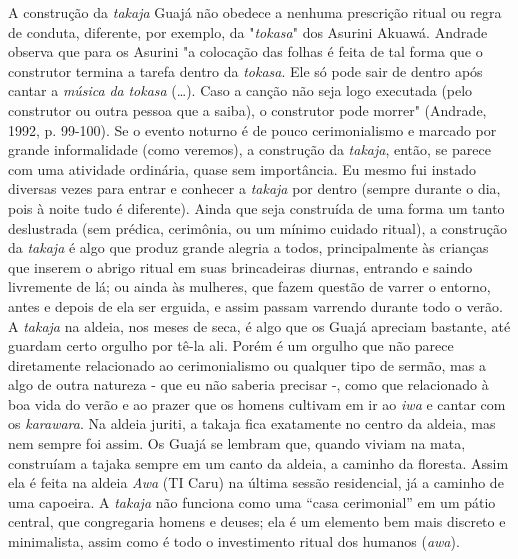 A construção da \emph{takaja} Guajá não obedece a nenhuma prescrição
ritual ou regra de conduta, diferente, por exemplo, da "\emph{tokasa}"
dos Asurini Akuawá. Andrade observa que para os Asurini "a colocação das
folhas é feita de tal forma que o construtor termina a tarefa dentro da
\emph{tokasa}. Ele só pode sair de dentro após cantar a \emph{música}
\emph{da} \emph{tokasa} (\ldots{}). Caso a canção não seja logo executada
(pelo construtor ou outra pessoa que a saiba), o construtor pode morrer"
(Andrade, 1992, p. 99-100). Se o evento noturno é de pouco
cerimonialismo e marcado por grande informalidade (como veremos), a
construção da \emph{takaja}, então, se parece com uma atividade
ordinária, quase sem importância. Eu mesmo fui instado diversas vezes
para entrar e conhecer a \emph{takaja} por dentro (sempre durante o dia,
pois à noite tudo é diferente). Ainda que seja construída de uma forma
um tanto deslustrada (sem prédica, cerimônia, ou um mínimo cuidado
ritual), a construção da \emph{takaja} é algo que produz grande alegria
a todos, principalmente às crianças que inserem o abrigo ritual em suas
brincadeiras diurnas, entrando e saindo livremente de lá; ou ainda às
mulheres, que fazem questão de varrer o entorno, antes e depois de ela
ser erguida, e assim passam varrendo durante todo o verão. A
\emph{takaja} na aldeia, nos meses de seca, é algo que os Guajá apreciam
bastante, até guardam certo orgulho por tê-la ali. Porém é um orgulho
que não parece diretamente relacionado ao cerimonialismo ou qualquer
tipo de sermão, mas a algo de outra natureza - que eu não saberia
precisar -, como que relacionado à boa vida do verão e ao prazer que os
homens cultivam em ir ao \emph{iwa} e cantar com os \emph{karawara}. Na
aldeia juriti, a takaja fica exatamente no centro da aldeia, mas nem
sempre foi assim. Os Guajá se lembram que, quando viviam na mata,
construíam a tajaka sempre em um canto da aldeia, a caminho da floresta.
Assim ela é feita na aldeia \emph{Awa} (TI Caru) na última sessão
residencial, já a caminho de uma capoeira. A \emph{takaja} não funciona
como uma ``casa cerimonial'' em um pátio central, que congregaria homens
e deuses; ela é um elemento bem mais discreto e minimalista, assim como
é todo o investimento ritual dos humanos (\emph{awa}).

